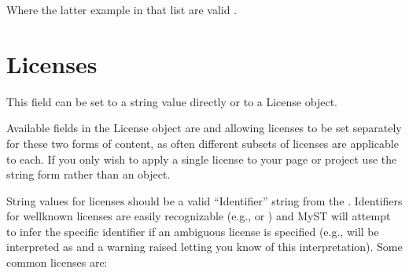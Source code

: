 \documentclass[letterpaper,12pt,english]{sphinxmanual}
\begin{document}
\sphinxAtStartPar
Where the latter example in that list are valid .


\section{Licenses}
\label{\detokenize{notebooks/02-myst.integration:licenses}}
\sphinxAtStartPar
This field can be set to a string value directly or to a License object.

\sphinxAtStartPar
Available fields in the License object are  and  allowing licenses to be set separately for these two forms of content, as often different subsets of licenses are applicable to each. If you only wish to apply a single license to your page or project use the string form rather than an object.

\sphinxAtStartPar
String values for licenses should be a valid “Identifier” string from the . Identifiers for well\sphinxhyphen{}known licenses are easily recognizable (e.g.,  or ) and MyST will attempt to infer the specific identifier if an ambiguous license is specified (e.g.,  will be interpreted as  and a warning raised letting you know of this interpretation). Some common licenses are:

\begin{sphinxVerbatim}[commandchars=\\\{\}]
\end{sphinxVerbatim}

\begin{sphinxVerbatim}[commandchars=\\\{\}]
\end{sphinxVerbatim}
\end{document}
